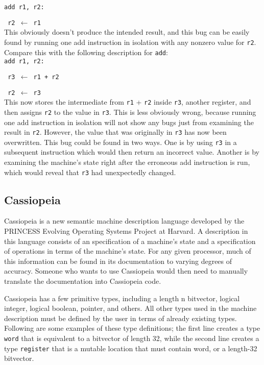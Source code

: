 \documentclass[letterpaper,12pt]{article}
\begin{document}
\texttt{add r1, r2:}

\texttt{\ r2 $\leftarrow$ r1}\\

This obviously doesn't produce the intended result, and this bug can be easily found by running one add instruction in isolation with any nonzero value for \texttt{r2}. Compare this with the following description for \texttt{add}:\\

\texttt{add r1, r2:}

\texttt{\ r3 $\leftarrow$ r1 + r2}

\texttt{\ r2 $\leftarrow$ r3}\\

This now stores the intermediate from \texttt{r1} + \texttt{r2} inside \texttt{r3}, another register, and then assigns \texttt{r2} to the value in \texttt{r3}. This is less obviously wrong, because running one add instruction in isolation will not show any bugs just from examining the result in \texttt{r2}. However, the value that was originally in \texttt{r3} has now been overwritten. This bug could be found in two ways. One is by using \texttt{r3} in a subsequent instruction which would then return an incorrect value. Another is by examining the machine's state right after the erroneous add instruction is run, which would reveal that \texttt{r3} had unexpectedly changed.

\subsection{Cassiopeia}

Cassiopeia is a new semantic machine description language developed by the PRINCESS Evolving Operating Systems Project at Harvard\cite{Princess}. A description in this language consists of an specification of a machine's state and a specification of operations in terms of the machine's state. For any given processor, much of this information can be found in its documentation to varying degrees of accuracy. Someone who wants to use Cassiopeia would then need to manually translate the documentation into Cassiopeia code.

Cassiopeia has a few primitive types, including a length n bitvector, logical integer, logical boolean, pointer, and others. All other types used in the machine description must be defined by the user in terms of already existing types. Following are some examples of these type definitions; the first line creates a type \texttt{word} that is equivalent to a bitvector of length 32, while the second line creates a type \texttt{register} that is a mutable location that must contain word, or a length-32 bitvector.\\
\end{document}
